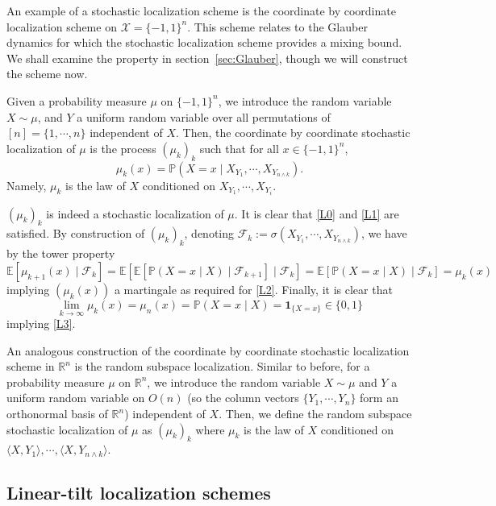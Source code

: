 An example of a stochastic localization scheme is the coordinate by coordinate localization scheme 
on \(\mathcal{X} = \{-1, 1\}^n\). This scheme relates to the Glauber dynamics for which the stochastic 
localization scheme provides a mixing bound. We shall examine the property in section~\ref{sec:Glauber}, 
though we will construct the scheme now. 

Given a probability measure \(\mu\) on \(\{-1, 1\}^n\), we introduce the random variable \(X \sim \mu\), and 
\(Y\) a uniform random variable over all permutations of \([n] = \{1, \cdots, n\}\) independent of \(X\). 
Then, the coordinate by coordinate stochastic localization of \(\mu\) is the process \((\mu_k)_{k}\)
such that for all \(x \in \{-1, 1\}^n\),
\[\mu_k(x) = \mathbb{P}(X = x \mid X_{Y_1}, \cdots, X_{Y_{n \wedge k}}).\]
Namely, \(\mu_k\) is the law of \(X\) conditioned on \(X_{Y_1}, \cdots, X_{Y_i}\).

\((\mu_k)_{k}\) is indeed a stochastic localization of \(\mu\). It is clear that \ref{L0} and \ref{L1} are 
satisfied. By construction of \((\mu_k)_k\), denoting 
\(\mathscr{F}_k := \sigma(X_{Y_1}, \cdots, X_{Y_{n \wedge k}})\), we have by the tower property
\[\mathbb{E}[\mu_{k + 1}(x) \mid \mathscr{F}_k] 
  = \mathbb{E}[\mathbb{E}[\mathbb{P}(X = x \mid X) \mid \mathscr{F}_{k + 1}] \mid \mathscr{F}_k]
  = \mathbb{E}[\mathbb{P}(X = x \mid X) \mid \mathscr{F}_k] = \mu_k(x)\]
implying \((\mu_k(x))\) a martingale as required for \ref{L2}. Finally, it is clear that
\[\lim_{k \to \infty} \mu_k(x) = \mu_n(x) = \mathbb{P}(X = x \mid X) = \mathbf{1}_{\{X = x\}} \in \{0, 1\}\]
implying \ref{L3}.

An analogous construction of the coordinate by coordinate stochastic localization scheme in \(\mathbb{R}^n\) 
is the random subspace localization. Similar to before, for a probability measure \(\mu\) on \(\mathbb{R}^n\),
we introduce the random variable \(X \sim \mu\) and \(Y\) a uniform random variable on \(O(n)\) 
(so the column vectors \(\{Y_1, \cdots, Y_n\}\) form an orthonormal basis of \(\mathbb{R}^n\)) 
independent of \(X\). Then, we define the random subspace stochastic localization of \(\mu\) as \((\mu_k)_k\) 
where \(\mu_k\) is the law of \(X\) conditioned on \(\langle X, Y_1\rangle, \cdots, \langle X, Y_{n \wedge k}\rangle\).

\subsection{Linear-tilt localization schemes}

